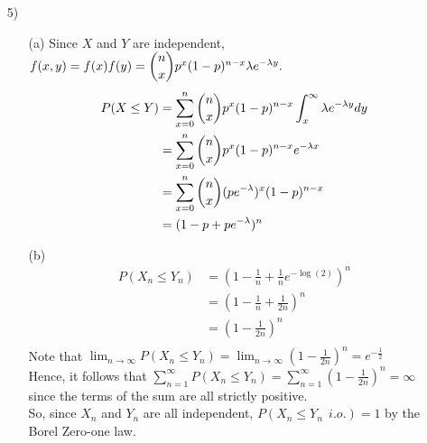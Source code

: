 \begin{enumerate}
\item[5)]
\begin{itemize}
\item[(a)] Since $X$ and $Y$ are independent, $f(x,y)=f(x)f(y) = \dbinom{n}{x}p^{x}(1-p)^{n-x} \lambda e^{-\lambda y}.$\\
\begin{align*}
P(X \leq Y)& = \sum_{x=0}^{n} \dbinom{n}{x}p^{x}(1-p)^{n-x} \int_{x}^{\infty} \lambda e^{-\lambda y} dy\\ 
&= \sum_{x=0}^{n} \dbinom{n}{x}p^{x}(1-p)^{n-x} e^{-\lambda x} 
\\&=  \sum_{x=0}^{n} \dbinom{n}{x}(pe^{-\lambda})^{x}(1-p)^{n-x} 
\\ &=(1 - p + pe^{-\lambda})^{n}
\end{align*}

\item[(b)]  \begin{align*} P(X_{n} \leq Y_{n}) &= (1 - \frac{1}{n} + \frac{1}{n}e^{-\log(2)})^{n} \\
&=  (1 - \frac{1}{n} + \frac{1}{2n})^{n} \\
&= (1 - \frac{1}{2n})^{n}\\
\end{align*}
Note that  $\lim_{n \rightarrow \infty} P(X_{n} \leq Y_{n}) = \lim_{n \rightarrow \infty} (1 - \frac{1}{2n})^{n} = e^{-\frac{1}{2}}$\\
Hence, it follows that $\sum_{n=1}^{\infty} P(X_{n} \leq Y_{n}) = \sum_{n=1}^{\infty} (1 - \frac{1}{2n})^{n} = \infty$ since the terms of the sum are all strictly positive.\\ 
So, since $X_{n}$ and $Y_{n}$ are all independent, $P(X_{n} \leq Y_{n} \ \ i.o.) = 1$ by the Borel Zero-one law. 
\end{itemize}
\end{enumerate}
